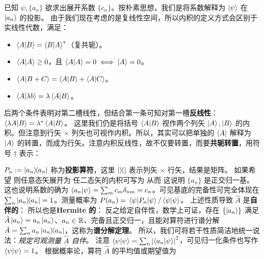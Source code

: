 已知 $\psi,\{a_n\}$ 欲求出展开系数 $\{c_n\}$。按朴素思想，我们是将系数解释为 $\ket{\psi}$ 在 $\ket{a_n}$ 的投影。
由于我们现在考虑的是复线性空间，所以内积的定义方式会区别于实线性代数，满足：
\begin{itemize}
    \item $\ip{A}{B}=\ip{B}{A}^*$（复共轭）。
    \item $\ip{A}{A}\geq 0$，且 $\ip{A}{A}=0\iff \ket{A}=0$。
    \item $\ip{A}{B+C}=\ip{A}{B}+\ip{A}{C}$。    \item $\ip{A}{\lambda b}=\lambda \ip{A}{B}$。
\end{itemize}
后两个条件表明对第二槽线性，但结合第一条可知对第一槽\textbf{反线性}：$\ip{\lambda A}{B}=\lambda^* \ip{A}{B}$。
这里我们仍是将括号 $\ip{A}{B}$ 视作两个列矢 $\ket{A},\ket{B}$ 的内积。但注意到行矢 $\times$ 列矢也可视作内积。所以，其实可以把单独的 $\bra{A}$ 解释为 $\ket{A}$ 的转置，而成为行矢。注意内积反线性，故不仅要转置，而要\textbf{共轭转置}，用符号 $\dagger$ 表示：

$P_n := \op{a_n}$ 称为\textbf{投影算符}，这里 $\op{}$ 表示列矢 $\times$ 行矢，结果是矩阵。
如果希望
则任意态矢展开为
任二态矢的内积可写为
从而
这说明 $\{a_n\}$ 是正交归一基。这也说明系数的确为 $\ip{a_n}{\psi} = \sum_m c_m \delta_{nm} = c_n$。可见基底的完备性可完全体现在 $\sum_n \op{a_n} = 1$。测量概率为 $P(a_n)=\ev{P_n}{\psi}/\ip{\psi}$。
上述性质导致 $\hat A$ 是\textbf{自伴的}：
所以也是\textbf{Hermite 的}：
反之给定自伴性，数学上可证，存在 $\{\ket{a_n}\}$ 满足 $\hat A \ket{a_n}=a_n \ket{a_n}$、$a_n\in\mathbb{R}$、完备且正交归一，且能对算符进行谱分解 $\hat A = \sum_n a_n \op{a_n}$，这称为\textbf{谱分解定理}。
所以，我们可将若干性质简洁地统一说法：\textit{规定可观测量 $\hat A$ 自伴}。
注意 $\ip{\psi} = \sum_n \abs{\ip{a_n}{\psi}}^2$，可见归一化条件也写作 $\ip{\psi}=1$。
根据概率论，算符 $\hat A$ 的平均值或期望值为


